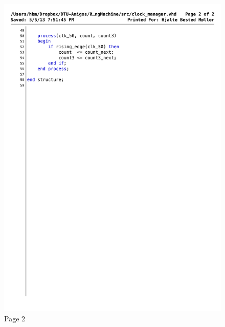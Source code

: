 \begin{figure}[!h]
\centering
\includegraphics[scale=0.7]{figs/clock_manager_2.pdf} 
\caption{Page 2}
\label{vhd:clockman2}
\end{figure}



